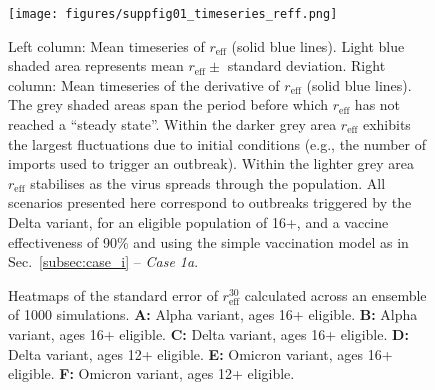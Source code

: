 \documentclass[article, a4, authoryear]{elsarticle}
\begin{document}
\begin{figure}[H]
    \centering
    \texttt{[image: figures/suppfig01\_timeseries\_reff.png]}
    
\caption{Left column: Mean timeseries of $r_\mathrm{eff}$ (solid blue lines). Light blue shaded area represents mean $r_\mathrm{eff} \pm $ standard deviation. Right column: Mean timeseries of the derivative of $r_\mathrm{eff}$ (solid blue lines). The grey shaded areas span the period before which 
$r_\mathrm{eff}$ has not reached a ``steady state''. Within the darker grey area $r_\mathrm{eff}$ exhibits the largest fluctuations due to initial conditions (e.g., the number of imports used to trigger an outbreak). Within the lighter grey area $r_\mathrm{eff}$ stabilises as the virus spreads through the population. All scenarios presented here correspond to outbreaks triggered by the Delta variant, for an eligible population of 16+, and a vaccine effectiveness of 90\% and using the simple vaccination model as in Sec.~\ref{subsec:case_i} -- \textit{Case 1a}.}
    \label{sup:fig:reff_timeseries}
\end{figure}

\begin{figure}[H]
    \centering
    \hfill
    \hfill
    \hfill
    \hfill
    \hfill
    \hfill
    \caption{Heatmaps of the standard error of $r_\mathrm{eff}^{30}$ calculated across an ensemble of 1000 simulations. \textbf{A:} Alpha variant, ages 16+ eligible. \textbf{B:} Alpha variant, ages 16+ eligible. \textbf{C:} Delta variant, ages 16+ eligible. \textbf{D:} Delta variant, ages 12+ eligible. \textbf{E:} Omicron variant, ages 16+ eligible. \textbf{F:} Omicron variant, ages 12+ eligible.}
    \label{sfig:heatmap_plot_reff_SEMs}
\end{figure}
  
\end{document}
